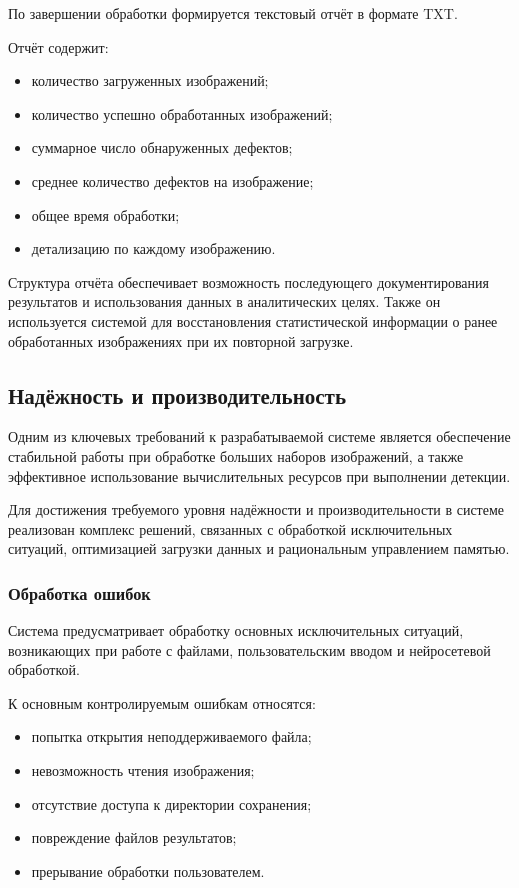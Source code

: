По завершении обработки формируется текстовый отчёт в формате TXT.

Отчёт содержит:

\begin{itemize}
	\item количество загруженных изображений;
	\item количество успешно обработанных изображений;
	\item суммарное число обнаруженных дефектов;
	\item среднее количество дефектов на изображение;
	\item общее время обработки;
	\item детализацию по каждому изображению.
\end{itemize}

Структура отчёта обеспечивает возможность последующего документирования результатов и использования данных в аналитических целях. Также он используется системой для восстановления статистической информации о ранее обработанных изображениях при их повторной загрузке.

\subsection{Надёжность и производительность}

Одним из ключевых требований к разрабатываемой системе является обеспечение стабильной работы при обработке больших наборов изображений, а также эффективное использование вычислительных ресурсов при выполнении детекции.

Для достижения требуемого уровня надёжности и производительности в системе реализован комплекс решений, связанных с обработкой исключительных ситуаций, оптимизацией загрузки данных и рациональным управлением памятью.

\subsubsection{Обработка ошибок}

Система предусматривает обработку основных исключительных ситуаций, возникающих при работе с файлами, пользовательским вводом и нейросетевой обработкой.

К основным контролируемым ошибкам относятся:

\begin{itemize}
	\item попытка открытия неподдерживаемого файла;
	\item невозможность чтения изображения;
	\item отсутствие доступа к директории сохранения;
	\item повреждение файлов результатов;
	\item прерывание обработки пользователем.
\end{itemize}

